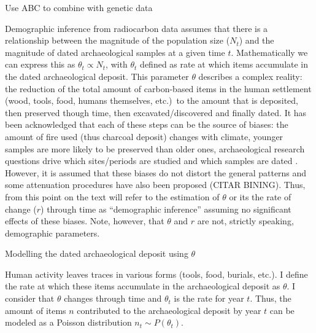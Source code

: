 \documentclass[a4paper]{article}
\begin{document}
Use ABC to combine with genetic data \parencite[supplementary figure 3 in ][]{Patterson2022}












Demographic inference from radiocarbon data assumes that there is a relationship between the magnitude of the population size ($N_t$) and the magnitude of dated archaeological samples at a given time $t$. Mathematically we can express this as $\theta_t \propto N_t$, with $\theta_t$ defined as rate at which items accumulate in the dated archaeological deposit. This parameter $\theta$ describes a complex reality: the reduction of the total amount of carbon-based items in the human settlement (wood, tools, food, humans themselves, etc.)\ to the amount that is deposited, then preserved though time, then excavated/discovered and finally dated. It has been acknowledged that each of these steps can be the source of biases: the amount of fire used (thus charcoal deposit) changes with climate, younger samples are more likely to be preserved than older ones, archaeological research questions drive which sites/periods are studied and which samples are dated \parencite{Rick1987,Williams2012}. However, it is assumed that these biases do not distort the general patterns and some attenuation procedures have also been proposed (CITAR BINING). Thus, from this point on the text will refer to the estimation of $\theta$ or its the rate of change ($r$) through time as ``demographic inference'' assuming no significant effects of these biases. Note, however, that $\theta$ and $r$ are not, strictly speaking, demographic parameters.

Modelling the dated archaeological deposit using $\theta$



Human activity leaves traces in various forms (tools, food, burials, etc.). I define the rate at which these items accumulate in the archaeological deposit as $\theta$. I consider that $\theta$ changes through time and $\theta_t$ is the rate for year $t$. Thus, the amount of items $n$ contributed to the archaeological deposit by year $t$ can be modeled as a Poisson distribution $n_t \sim P(\theta_t)$.

\end{document}
